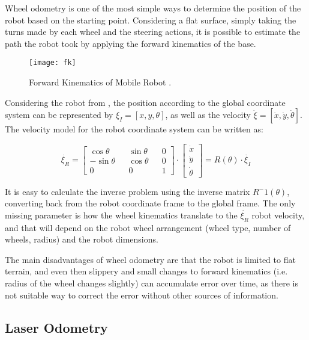 Wheel odometry is one of the most simple ways to determine the position of the robot based on the starting point. Considering a flat surface, simply taking the turns made by each wheel and the steering actions, it is possible to estimate the path the robot took by applying the forward kinematics of the base.

\begin{figure}
    \centering
    \texttt{[image: fk]}
    \caption{Forward Kinematics of Mobile Robot \cite{thrun2005probabilistic}.}
    \label{fig:fk}
\end{figure}

Considering the robot from , the position according to the global coordinate system can be represented by $\xi_I = [x, y, \theta]$, as well as the velocity $\dot{\xi} = [\dot{x}, \dot{y}, \dot{\theta}]$. The velocity model for the robot coordinate system can be written as:

\begin{equation}
\dot{\xi_R} = 
\begin{bmatrix}
\cos \theta && \sin \theta && 0 \\
- \sin \theta  && \cos \theta && 0 \\
0 && 0 && 1
\end{bmatrix}
\cdot 
\begin{bmatrix}
\dot{x} \\
\dot{y} \\
\dot{\theta}
\end{bmatrix}
=
R(\theta) \cdot \dot{\xi_I}
\end{equation}

It is easy to calculate the inverse problem using the inverse matrix $R^-1(\theta)$, converting back from the robot coordinate frame to the global frame. The only missing parameter is how the wheel kinematics translate to the $\dot{\xi_R}$ robot velocity, and that will depend on the robot wheel arrangement (wheel type, number of wheels, radius) and the robot dimensions.

The main disadvantages of wheel odometry are that the robot is limited to flat terrain, and even then slippery and small changes to forward kinematics (i.e. radius of the wheel changes slightly) can accumulate error over time, as there is not suitable way to correct the error without other sources of information.

\subsection{Laser Odometry}

